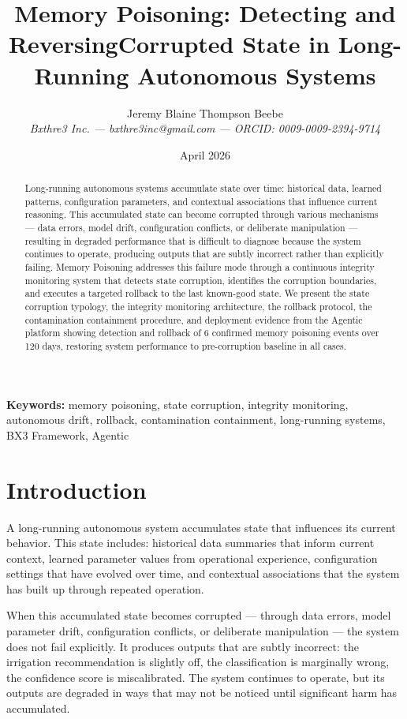 \documentclass[12pt]{article}
\title{Memory Poisoning: Detecting and ReversingCorrupted State in Long-Running Autonomous Systems}
\author{Jeremy Blaine Thompson Beebe\\ \textit{Bxthre3 Inc. --- bxthre3inc@gmail.com --- ORCID: 0009-0009-2394-9714}}
\date{April 2026}
\begin{document}
\maketitle

\begin{abstract}\noindent
Long-running autonomous systems accumulate state over time: historical data, learned patterns, configuration parameters, and contextual associations that influence current reasoning. This accumulated state can become corrupted through various mechanisms --- data errors, model drift, configuration conflicts, or deliberate manipulation --- resulting in degraded performance that is difficult to diagnose because the system continues to operate, producing outputs that are subtly incorrect rather than explicitly failing. Memory Poisoning addresses this failure mode through a continuous integrity monitoring system that detects state corruption, identifies the corruption boundaries, and executes a targeted rollback to the last known-good state. We present the state corruption typology, the integrity monitoring architecture, the rollback protocol, the contamination containment procedure, and deployment evidence from the Agentic platform showing detection and rollback of 6 confirmed memory poisoning events over 120 days, restoring system performance to pre-corruption baseline in all cases.
\end{abstract}

\medskip\noindent\textbf{Keywords:} memory poisoning, state corruption, integrity monitoring, autonomous drift, rollback, contamination containment, long-running systems, BX3 Framework, Agentic

\newpage

\section{Introduction}
A long-running autonomous system accumulates state that influences its current behavior. This state includes: historical data summaries that inform current context, learned parameter values from operational experience, configuration settings that have evolved over time, and contextual associations that the system has built up through repeated operation.

When this accumulated state becomes corrupted --- through data errors, model parameter drift, configuration conflicts, or deliberate manipulation --- the system does not fail explicitly. It produces outputs that are subtly incorrect: the irrigation recommendation is slightly off, the classification is marginally wrong, the confidence score is miscalibrated. The system continues to operate, but its outputs are degraded in ways that may not be noticed until significant harm has accumulated.
\end{document}
